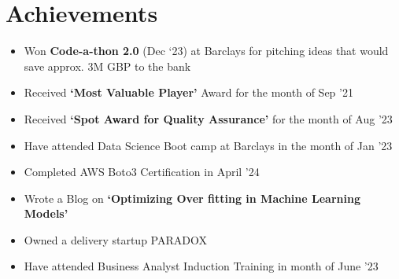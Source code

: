 \documentclass[letterpaper,11pt]{article}
\newcommand{\resumeItem}[1]{
  \item\small{
    {#1 \vspace{-2pt}}
  }
}
\newcommand{\resumeItemListStart}{\begin{itemize}}
\newcommand{\resumeItemListEnd}{\end{itemize}\vspace{-5pt}}
\begin{document}
 \section{Achievements}
  \resumeItemListStart
   
    \resumeItem{Won \textbf{Code-a-thon 2.0} (Dec ‘23) at Barclays for pitching ideas that would save approx. 3M GBP to the bank}
    \resumeItem{Received \textbf{‘Most Valuable Player’} Award for the month of Sep ’21}
    \resumeItem{Received \textbf{‘Spot Award for Quality Assurance’} for the month of Aug ’23}
    \resumeItem{Have attended Data Science Boot camp at Barclays in the month of Jan ’23}
    \resumeItem{Completed AWS Boto3 Certification in April ’24}
    \resumeItem{Wrote a Blog on \textbf{‘Optimizing Over fitting in Machine Learning Models’}}
    \resumeItem{Owned a delivery startup PARADOX}
    \resumeItem{Have attended Business Analyst Induction Training in month of June ’23}
  
  \resumeItemListEnd


\end{document}
